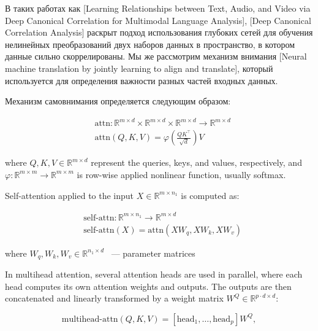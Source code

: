 \documentclass[a4paper,14pt]{article}
\newcommand{\dR}{\mathbb{R}}
\theoremstyle{plain} %
\theoremstyle{definition} %
\theoremstyle{remark} %
\begin{document}
        В таких работах как [Learning Relationships between Text, Audio, and Video via Deep Canonical Correlation for Multimodal Language Analysis], [Deep Canonical Correlation Analysis] раскрыт подход использования глубоких сетей для обучения нелинейных преобразований двух наборов данных в пространство, в котором данные сильно скоррелированы. Мы же рассмотрим механизм внимания [Neural machine translation by jointly learning to align and translate], который используется для определения важности разных частей входных данных. 

        Механизм самовнимания определяется следующим образом:
	
	\begin{equation}
		\begin{aligned}
			&\text{attn}: \mathbb{R}^{m \times d} \times \mathbb{R}^{m \times d} \times \mathbb{R}^{m \times d} \longrightarrow \mathbb{R}^{m \times d} \\
			&\text{attn}(Q, K, V) = \varphi\left(\frac{Q K^\top}{\sqrt{d}}\right) V
		\end{aligned}
		\label{attn}
	\end{equation}
	
        where $Q, K, V \in \dR^{m \times d}$ represent the queries, keys, and values, respectively, and $\varphi: \dR^{m \times m} \longrightarrow \dR^{m \times m}$ is row-wise applied nonlinear function, usually softmax.
	
        Self-attention applied to the input $X \in \dR^{m \times n_1}$ is computed as:
	
	\begin{equation}
		\begin{aligned}
			&\text{self-attn}: \mathbb{R}^{m \times n_1} \longrightarrow \mathbb{R}^{m \times d} \\
			&\text{self-attn}(X) = \text{attn}(X W_q, X W_k, X W_v)
		\end{aligned}
		\label{self-attn}
	\end{equation}

	where $W_q, W_k, W_v \in \dR^{n_1 \times d}$ ~--- parameter matrices
	
        In multihead attention, several attention heads are used in parallel, where each head computes its own attention weights and outputs. The outputs are then concatenated and linearly transformed by a weight matrix $W^Q \in \dR^{p \cdot d \times d}$:
	
	\begin{equation}
		\text{multihead-attn}(Q, K, V) = [\text{head}_1, \ldots, \text{head}_p] W^Q,
		\label{multihead-attn}
	\end{equation}
	
\end{document}
